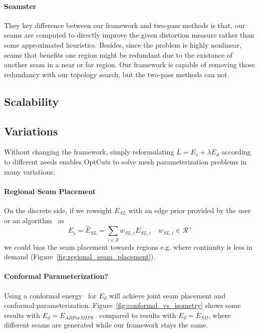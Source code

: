\paragraph{Seamster}
They key difference between our framework and two-pass methods is that, our seams are computed to directly improve the given distortion measure rather than some approximated heuristics. Besides, since the problem is highly nonlinear, seams that benefits one region might be redundant due to the existance of another seam in a near or far region. Our framework is capable of removing those redundancy with our topology search, but the two-pass methods can not.


\subsection{Scalability}


\subsection{Variations}

Without changing the framework, simply reformulating $L = E_s + \lambda E_d$ according to different needs enables OptCuts to solve mesh parameterization problems in many variations:

\paragraph{Regional Seam Placement}
On the discrete side, if we reweight $E_{SL}$ with an edge prior provided by the user or an algorithm~\cite{} as
\[ E_s = \hat{E}_{SL} = \sum_{i\in\mathcal{S}} w_{SL,i} E_{SL,i} \quad w_{SL,i} \in \mathcal{R^+} \]
we could bias the seam placement towards regions e.g. where continuity is less in demand (Figure~\ref{fig:regional_seam_placement}).

\paragraph{Conformal Parameterization?}
Using a conformal energy~\cite{Hormann2000MIPS,Sheffer2005ABFPP} for $E_d$ will achieve joint seam placement and conformal parameterization. Figure~\ref{fig:conformal_vs_isometry} shows some results with $E_d = E_{ABForMIPS}$~\cite{} compared to results with $E_d = E_{SD}$, where different seams are generated while our framework stays the same.

